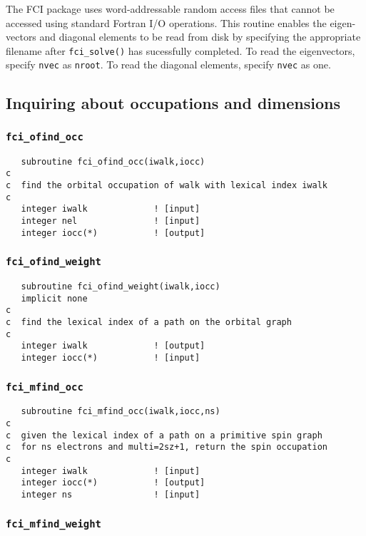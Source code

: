 The FCI package uses word-addressable random access files that cannot
be accessed using standard Fortran I/O operations.  This routine
enables the eigen-vectors and diagonal elements to be read from disk
by specifying the appropriate filename after \verb+fci_solve()+ has
sucessfully completed.  To read the eigenvectors, specify \verb+nvec+
as \verb+nroot+.  To read the diagonal elements, specify \verb+nvec+
as one.

\subsection{Inquiring about occupations and dimensions}

\subsubsection{{\tt fci\_ofind\_occ}}
\begin{verbatim}
   subroutine fci_ofind_occ(iwalk,iocc)
c  
c  find the orbital occupation of walk with lexical index iwalk
c     
   integer iwalk             ! [input]
   integer nel               ! [input]
   integer iocc(*)           ! [output]
\end{verbatim}

\subsubsection{{\tt fci\_ofind\_weight}}
\begin{verbatim}
   subroutine fci_ofind_weight(iwalk,iocc)
   implicit none
c     
c  find the lexical index of a path on the orbital graph
c     
   integer iwalk             ! [output]
   integer iocc(*)           ! [input]
\end{verbatim}

\subsubsection{{\tt fci\_mfind\_occ}}
\begin{verbatim}
   subroutine fci_mfind_occ(iwalk,iocc,ns)
c     
c  given the lexical index of a path on a primitive spin graph
c  for ns electrons and multi=2sz+1, return the spin occupation
c     
   integer iwalk             ! [input]
   integer iocc(*)           ! [output]
   integer ns                ! [input]
\end{verbatim}

\subsubsection{{\tt fci\_mfind\_weight}}

